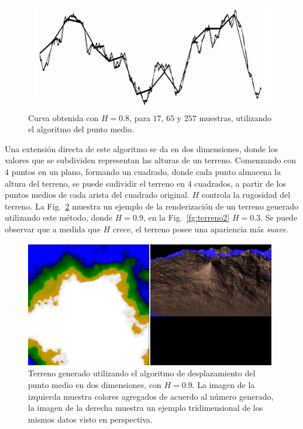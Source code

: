 \begin{figure}
\center
\includegraphics[width=11cm]{figures/puntomedio}
\caption[Curva obtenida utilizando el algoritmo del punto medio]{Curva obtenida con $H=0.8$, para $17$, $65$ y $257$ muestras, utilizando el algoritmo del punto medio.}
\label{fg:puntomedio}
\end{figure}


Una extensión directa de este algoritmo se da en dos dimensiones, donde los valores que se subdividen representan las alturas de un terreno.
Comenzando con $4$ puntos en un plano, formando un cuadrado, donde cada punto almacena la altura del terreno, se puede sudividir el terreno en $4$ cuadrados, a partir de los puntos medios de cada arista del cuadrado original.
$H$ controla la rugosidad del terreno.
La Fig.~\ref{fg:terreno} muestra un ejemplo de la renderización de un terreno generado utilizando este método, donde $H = 0.9$, en la Fig.~\ref{fg:terreno2} $H = 0.3$.
Se puede observar que a medida que $H$ crece, el terreno posee una apariencia más {\em suave}.

\begin{figure}
\center
\includegraphics[width=11cm]{figures/terreno}
\caption[Terreno generado utilizando el algoritmo de desplazamiento del punto medio en dos dimensiones, con $H = 0.9$]{Terreno generado utilizando el algoritmo de desplazamiento del punto medio en dos dimensiones, con $H = 0.9$. La imagen de la izquierda muestra colores agregados de acuerdo al número generado, la imagen de la derecha muestra un ejemplo tridimensional de los mismos datos visto en perspectiva.}
\label{fg:terreno}
\end{figure}

